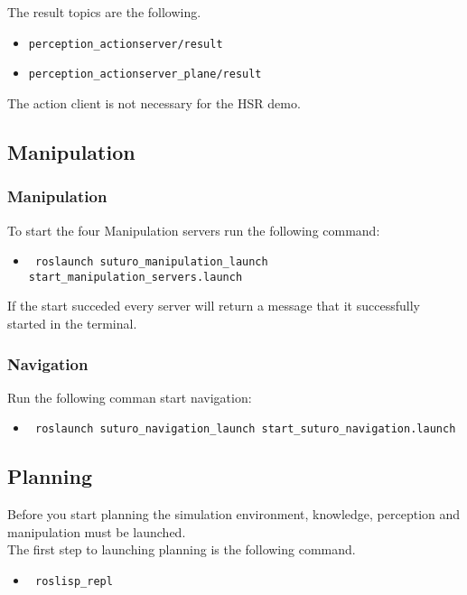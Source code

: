 \documentclass[main.tex]{subfiles}
\begin{document}
The result topics are the following.
\begin{itemize}
\item \begin{verbatim}
perception_actionserver/result
\end{verbatim}
\item \begin{verbatim}
perception_actionserver_plane/result
\end{verbatim}
\end{itemize}

The action client is not necessary for the HSR demo.
	
	\subsection{Manipulation}
	\subsubsection{Manipulation}
	To start the four Manipulation servers run the following command:
	\begin{itemize}
		\item \begin{verbatim} roslaunch suturo_manipulation_launch start_manipulation_servers.launch \end{verbatim}
	\end{itemize}
	If the start succeded every server will return a message that it successfully started in the terminal.	
	
	\subsubsection{Navigation}
	Run the following comman start navigation:
	\begin{itemize}
		\item \begin{verbatim} roslaunch suturo_navigation_launch start_suturo_navigation.launch \end{verbatim}
	\end{itemize}
	
	\subsection{Planning}
	Before you start planning the simulation environment, knowledge, perception and manipulation must be launched.\\
	The first step to launching planning is the following command.
	\begin{itemize}
\item \begin{verbatim} roslisp_repl \end{verbatim} 
\end{itemize}
\end{document}
